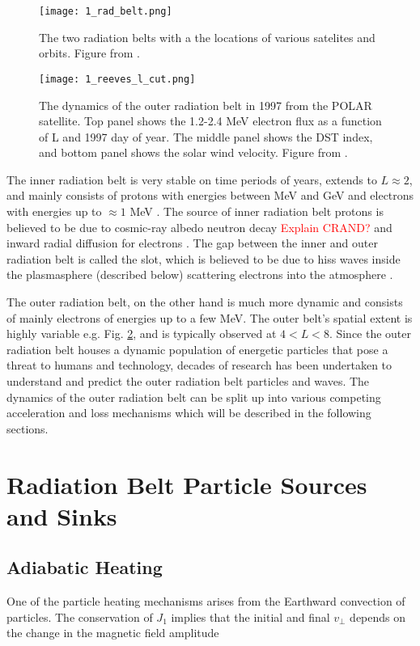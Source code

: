 \begin{figure}
\texttt{[image: 1\_rad\_belt.png]}
\caption{The two radiation belts with a the locations of various satelites and orbits. Figure from \citep{Horne2013}.}
\label{Intro:rad_belts}
\end{figure}

\begin{figure}
\texttt{[image: 1\_reeves\_l\_cut.png]}
\caption{The dynamics of the outer radiation belt in 1997 from the POLAR satellite. Top panel shows the 1.2-2.4 MeV electron flux as a function of L and 1997 day of year. The middle panel shows the DST index, and bottom panel shows the solar wind velocity. Figure from \citep{Reeves2003}.}
\label{Intro:reeves_l_cut}
\end{figure}

The inner radiation belt is very stable on time periods of years, extends to $L \approx 2$, and mainly consists of protons with energies between MeV and GeV and electrons with energies up to $\approx 1$ MeV \citep{Claudepierre2019}. The source of inner radiation belt protons is believed to be due to cosmic-ray albedo neutron decay \citep[e.g.][]{Li2017_CRAND} \textcolor{red}{Explain CRAND?} and inward radial diffusion for electrons \citep[e.g.][]{O'Brien2016_inner}. The gap between the inner and outer radiation belt is called the slot, which is believed to be due to hiss waves inside the plasmasphere (described below) scattering electrons into the atmosphere \citep[e.g.][]{Lyons1973, Breneman2015}.

The outer radiation belt, on the other hand is much more dynamic and consists of mainly electrons of energies up to a few MeV. The outer belt's spatial extent is highly variable e.g. Fig. \ref{Intro:reeves_l_cut}, and is typically observed at $4 < L < 8$. Since the outer radiation belt houses a dynamic population of energetic particles that pose a threat to humans and technology, decades of research has been undertaken to understand and predict the outer radiation belt particles and waves. The dynamics of the outer radiation belt can be split up into various competing acceleration and loss mechanisms which will be described in the following sections.

\section{Radiation Belt Particle Sources and Sinks}\label{Intro:sources_sinks}

\subsection{Adiabatic Heating}\label{Intro:adiabatic_heating}
One of the particle heating mechanisms arises from the Earthward convection of particles. The conservation of $J_1$ implies that the initial and final $v_\perp$ depends on the change in the magnetic field amplitude

